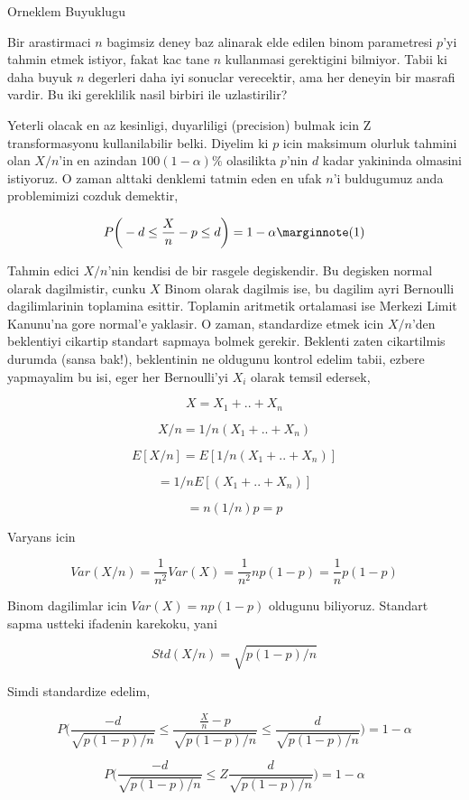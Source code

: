 \documentclass[12pt,fleqn]{article}\usepackage{../common}
\begin{document}
Orneklem Buyuklugu

Bir arastirmaci $n$ bagimsiz deney baz alinarak elde edilen binom
parametresi $p$'yi tahmin etmek istiyor, fakat kac tane $n$ kullanmasi
gerektigini bilmiyor. Tabii ki daha buyuk $n$ degerleri daha iyi sonuclar
verecektir, ama her deneyin bir masrafi vardir. Bu iki gereklilik nasil
birbiri ile uzlastirilir?

Yeterli olacak en az kesinligi, duyarliligi (precision) bulmak icin Z
transformasyonu kullanilabilir belki. Diyelim ki $p$ icin maksimum olurluk
tahmini olan $X/n$'in en azindan $100(1-\alpha)\%$ olasilikta $p$'nin $d$
kadar yakininda olmasini istiyoruz. O zaman alttaki denklemi tatmin eden en
ufak $n$'i buldugumuz anda problemimizi cozduk demektir, 

$$ P\bigg( -d \le \frac{X}{n} - p \le d \bigg)  = 1-\alpha
\mlabel{1}
$$

Tahmin edici $X/n$'nin kendisi de bir rasgele degiskendir. Bu degisken
normal olarak dagilmistir, cunku $X$ Binom olarak dagilmis ise, bu dagilim
ayri Bernoulli dagilimlarinin toplamina esittir. Toplamin aritmetik
ortalamasi ise Merkezi Limit Kanunu'na gore normal'e yaklasir. O zaman,
standardize etmek icin $X/n$'den beklentiyi cikartip standart sapmaya
bolmek gerekir. Beklenti zaten cikartilmis durumda (sansa bak!),
beklentinin ne oldugunu kontrol edelim tabii, ezbere yapmayalim bu isi,
eger her Bernoulli'yi $X_i$ olarak temsil edersek,

$$ X = X_1 + .. + X_n $$

$$ X/n = 1/n(X_1 + .. + X_n )$$

$$ E[X/n] = E[1/n(X_1 + .. + X_n )]$$

$$  = 1/nE[(X_1 + .. + X_n )]$$

$$  = n(1/n) p = p$$

Varyans icin

$$ Var(X/n) = \frac{1}{n^2}Var(X) = \frac{1}{n^2}np(1-p)=
\frac{1}{n}p(1-p) 
$$

Binom dagilimlar icin $Var(X) = np(1-p)$ oldugunu biliyoruz. Standart sapma
ustteki ifadenin karekoku, yani

$$ Std(X/n) = \sqrt{p(1-p)/n}
$$

Simdi standardize edelim,

$$ P\bigg( 
\frac{-d}{\sqrt{p(1-p)/n}} \le 
\frac{\frac{X}{n} - p }{\sqrt{p(1-p)/n}}\le 
\frac{d}{\sqrt{p(1-p)/n}} 
\bigg)  = 
1-\alpha$$


$$ P\bigg( 
\frac{-d}{\sqrt{p(1-p)/n}} \le 
Z
\frac{d}{\sqrt{p(1-p)/n}} 
\bigg)  = 
1-\alpha$$
\end{document}
